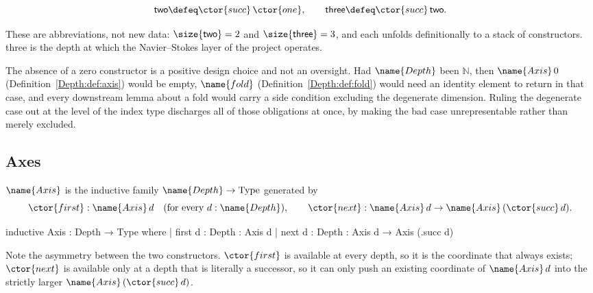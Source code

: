 \begin{definition}
\label{Depth:def:small-depths}
\[
  \mathsf{two} \defeq \ctor{succ}\,\ctor{one},
  \qquad
  \mathsf{three} \defeq \ctor{succ}\,\mathsf{two} .
\]
\end{definition}

These are abbreviations, not new data: $\size{\mathsf{two}} = 2$ and
$\size{\mathsf{three}} = 3$, and each unfolds definitionally to a stack of
constructors.  \textsf{three} is the depth at which the Navier--Stokes layer
of the project operates.

\begin{designnote}\label{Depth:note:no-zero}
The absence of a zero constructor is a positive design choice and not an
oversight.  Had $\name{Depth}$ been $\mathbb{N}$, then $\name{Axis}\,0$
(Definition~\ref{Depth:def:axis}) would be empty, $\name{fold}$
(Definition~\ref{Depth:def:fold}) would need an identity element to return in that
case, and every downstream lemma about a fold would carry a side condition
excluding the degenerate dimension.  Ruling the degenerate case out at the
level of the index type discharges all of those obligations at once, by making
the bad case unrepresentable rather than merely excluded.
\end{designnote}

\subsection{Axes}

\begin{definition}\label{Depth:def:axis}
$\name{Axis}$ is the inductive family $\name{Depth} \to \mathrm{Type}$ generated by
\[
  \ctor{first} : \name{Axis}\,d \quad (\text{for every } d : \name{Depth}),
  \qquad
  \ctor{next} : \name{Axis}\,d \to \name{Axis}\,(\ctor{succ}\, d).
\]
\end{definition}

\begin{leancode}
inductive Axis : Depth → Type where
  | first {d : Depth} : Axis d
  | next {d : Depth} : Axis d → Axis (.succ d)
\end{leancode}

Note the asymmetry between the two constructors.  $\ctor{first}$ is available at
every depth, so it is the coordinate that always exists; $\ctor{next}$ is available
only at a depth that is literally a successor, so it can only push an existing
coordinate of $\name{Axis}\,d$ into the strictly larger $\name{Axis}\,(\ctor{succ}\, d)$.

